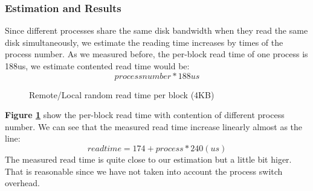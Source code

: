 \subsubsection{Estimation and Results}
Since different processes share the same disk bandwidth when they read the same disk simultaneously, we estimate the reading time increases by times of the process number. As we measured before, the per-block read time of one process is 188us, we estimate contented read time would be:
$$process number * 188us$$

\begin{figure}[ht]
    \centering
    \caption{Remote/Local random read time per block (4KB)}
    \label{contention_read_time}
\end{figure}

\textbf{Figure \ref{contention_read_time}} show the per-block read time with contention of different process number. We can see that the measured read time increase linearly almost as the line:
$$ read time = 174 + process * 240 (us)$$
The measured read time is quite close to our estimation but a little bit higer. That is reasonable since we have not taken into account the process switch overhead.
